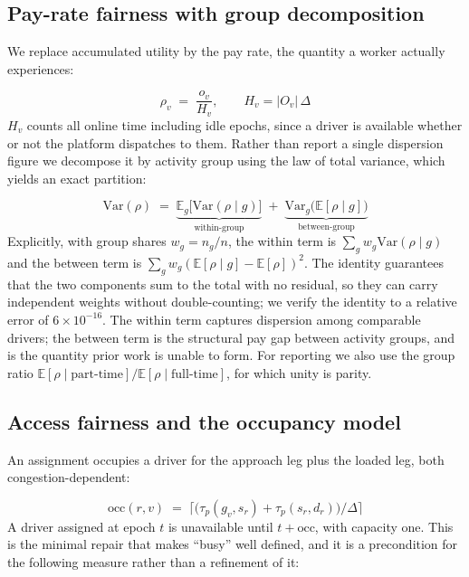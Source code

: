 \documentclass[10pt,twocolumn]{article}
\begin{document}
\subsection{Pay-rate fairness with group decomposition}
We replace accumulated utility by the pay rate, the quantity a worker actually experiences:

\begin{equation}\label{eq:rate}
\rho_v \;=\; \frac{o_v}{H_v}, \qquad H_v = |O_v|\,\Delta
\end{equation}
\(H_v\) counts all online time including idle epochs, since a driver is available whether or not the platform dispatches to them. Rather than report a single dispersion figure we decompose it by activity group using the law of total variance, which yields an exact partition:

\begin{equation}\label{eq:ltv}
\mathrm{Var}(\rho) \;=\; \underbrace{\mathbb{E}_g\big[\mathrm{Var}(\rho \mid g)\big]}_{\text{within-group}} \;+\; \underbrace{\mathrm{Var}_g\big(\mathbb{E}[\rho \mid g]\big)}_{\text{between-group}}
\end{equation}
Explicitly, with group shares \(w_g = n_g/n\), the within term is \(\sum_g w_g \mathrm{Var}(\rho \mid g)\) and the between term is \(\sum_g w_g (\mathbb{E}[\rho \mid g] - \mathbb{E}[\rho])^2\). The identity guarantees that the two components sum to the total with no residual, so they can carry independent weights without double-counting; we verify the identity to a relative error of \(6 \times 10^{-16}\). The within term captures dispersion among comparable drivers; the between term is the structural pay gap between activity groups, and is the quantity prior work is unable to form. For reporting we also use the group ratio \(\mathbb{E}[\rho \mid \text{part-time}] / \mathbb{E}[\rho \mid \text{full-time}]\), for which unity is parity.

\subsection{Access fairness and the occupancy model}
An assignment occupies a driver for the approach leg plus the loaded leg, both congestion-dependent:

\begin{equation}\label{eq:occ}
\mathrm{occ}(r,v) \;=\; \Big\lceil \big(\tau_p(g_v,s_r) + \tau_p(s_r,d_r)\big) / \Delta \Big\rceil
\end{equation}
A driver assigned at epoch \(t\) is unavailable until \(t + \mathrm{occ}\), with capacity one. This is the minimal repair that makes ``busy'' well defined, and it is a precondition for the following measure rather than a refinement of it:
\end{document}
